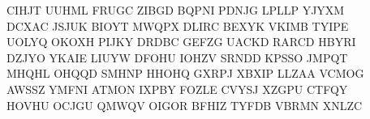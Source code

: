 \documentclass{article}
\begin{document}

CIHJT UUHML FRUGC ZIBGD BQPNI PDNJG LPLLP YJYXM\\
DCXAC JSJUK BIOYT MWQPX DLIRC BEXYK VKIMB TYIPE\\
UOLYQ OKOXH PIJKY DRDBC GEFZG UACKD RARCD HBYRI\\
DZJYO YKAIE LIUYW DFOHU IOHZV SRNDD KPSSO JMPQT\\
MHQHL OHQQD SMHNP HHOHQ GXRPJ XBXIP LLZAA VCMOG\\
AWSSZ YMFNI ATMON IXPBY FOZLE CVYSJ XZGPU CTFQY\\
HOVHU OCJGU QMWQV OIGOR BFHIZ TYFDB VBRMN XNLZC
\end{document}
